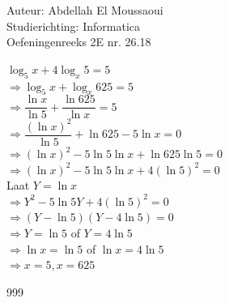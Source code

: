 \documentclass[a4paper]{article}
\begin{document}
  
\noindent \large Auteur: Abdellah El Moussaoui \\
\noindent \large Studierichting: Informatica\\
\noindent \large Oefeningenreeks 2E nr. 26.18\\

\medskip

\normalsize

$\log_5x+4\log_x5=5$ \\

$\Rightarrow \log_5x+\log_x625=5$\\

$\Rightarrow \dfrac{\ln{x}}{\ln5} + \dfrac{\ln625}{\ln{x}} = 5$\\

$\Rightarrow \dfrac{(\ln{x})^2}{\ln5} + \ln625 - 5\ln{x} = 0$\\

$\Rightarrow (\ln{x})^2 - 5\ln5\ln{x} + \ln625\ln5 = 0$\\

$\Rightarrow (\ln{x})^2 - 5\ln5\ln{x} + 4(\ln5)^2 = 0$\\

Laat $Y = \ln{x}$\\

$\Rightarrow Y^2 - 5\ln5Y + 4(\ln5)^2 = 0$\\

$\Rightarrow (Y-\ln5)(Y-4\ln5)=0$\\

$\Rightarrow Y=\ln5 $ of $ Y=4\ln5$\\

$\Rightarrow \ln{x}=\ln5 $ of $ \ln{x}=4\ln5$\\

$\Rightarrow \boxed{x=5 , x=625}$\\

\begin{thebibliography}{999}
\end{thebibliography}
\end{document}
